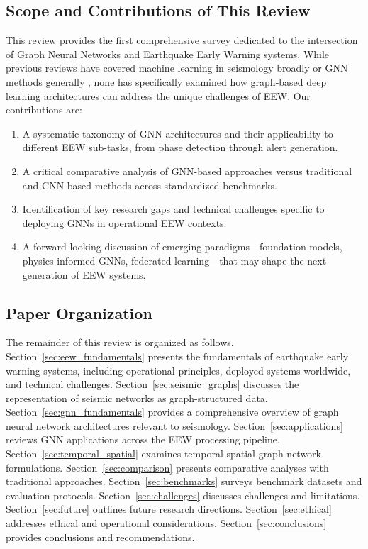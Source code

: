 \documentclass[review,authoryear]{elsarticle}
\begin{document}
\subsection{Scope and Contributions of This Review}

This review provides the first comprehensive survey dedicated to the intersection of Graph Neural Networks and Earthquake Early Warning systems. While previous reviews have covered machine learning in seismology broadly \citep{mousavi2023review, bergen2019machine, kong2019machine} or GNN methods generally \citep{wu2021comprehensive, zhou2020graph}, none has specifically examined how graph-based deep learning architectures can address the unique challenges of EEW. Our contributions are:

\begin{enumerate}
  \item A systematic taxonomy of GNN architectures and their applicability to different EEW sub-tasks, from phase detection through alert generation.
  \item A critical comparative analysis of GNN-based approaches versus traditional and CNN-based methods across standardized benchmarks.
  \item Identification of key research gaps and technical challenges specific to deploying GNNs in operational EEW contexts.
  \item A forward-looking discussion of emerging paradigms---foundation models, physics-informed GNNs, federated learning---that may shape the next generation of EEW systems.
\end{enumerate}

\subsection{Paper Organization}

The remainder of this review is organized as follows. Section~\ref{sec:eew_fundamentals} presents the fundamentals of earthquake early warning systems, including operational principles, deployed systems worldwide, and technical challenges. Section~\ref{sec:seismic_graphs} discusses the representation of seismic networks as graph-structured data. Section~\ref{sec:gnn_fundamentals} provides a comprehensive overview of graph neural network architectures relevant to seismology. Section~\ref{sec:applications} reviews GNN applications across the EEW processing pipeline. Section~\ref{sec:temporal_spatial} examines temporal-spatial graph network formulations. Section~\ref{sec:comparison} presents comparative analyses with traditional approaches. Section~\ref{sec:benchmarks} surveys benchmark datasets and evaluation protocols. Section~\ref{sec:challenges} discusses challenges and limitations. Section~\ref{sec:future} outlines future research directions. Section~\ref{sec:ethical} addresses ethical and operational considerations. Section~\ref{sec:conclusions} provides conclusions and recommendations.
\end{document}
